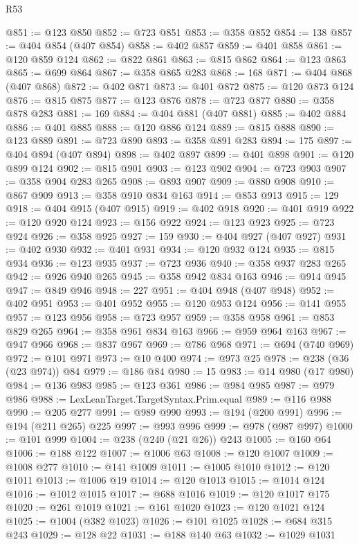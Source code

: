 \begin{lexlean}{R53}
\begin{coremodule}
@851 := @123 @850
@852 := @723 @851
@853 := @358 @852
@854 := 138
@857 := @404 @854 (@407 @854)
@858 := @402 @857
@859 := @401 @858
@861 := @120 @859 @124
@862 := @822 @861
@863 := @815 @862
@864 := @123 @863
@865 := @699 @864
@867 := @358 @865 @283
@868 := 168
@871 := @404 @868 (@407 @868)
@872 := @402 @871
@873 := @401 @872
@875 := @120 @873 @124
@876 := @815 @875
@877 := @123 @876
@878 := @723 @877
@880 := @358 @878 @283
@881 := 169
@884 := @404 @881 (@407 @881)
@885 := @402 @884
@886 := @401 @885
@888 := @120 @886 @124
@889 := @815 @888
@890 := @123 @889
@891 := @723 @890
@893 := @358 @891 @283
@894 := 175
@897 := @404 @894 (@407 @894)
@898 := @402 @897
@899 := @401 @898
@901 := @120 @899 @124
@902 := @815 @901
@903 := @123 @902
@904 := @723 @903
@907 := @358 @904 @283 @265
@908 := @893 @907
@909 := @880 @908
@910 := @867 @909
@913 := @358 @910 @834 @163
@914 := @853 @913
@915 := 129
@918 := @404 @915 (@407 @915)
@919 := @402 @918
@920 := @401 @919
@922 := @120 @920 @124
@923 := @156 @922
@924 := @123 @923
@925 := @723 @924
@926 := @358 @925
@927 := 159
@930 := @404 @927 (@407 @927)
@931 := @402 @930
@932 := @401 @931
@934 := @120 @932 @124
@935 := @815 @934
@936 := @123 @935
@937 := @723 @936
@940 := @358 @937 @283 @265
@942 := @926 @940 @265
@945 := @358 @942 @834 @163
@946 := @914 @945
@947 := @849 @946
@948 := 227
@951 := @404 @948 (@407 @948)
@952 := @402 @951
@953 := @401 @952
@955 := @120 @953 @124
@956 := @141 @955
@957 := @123 @956
@958 := @723 @957
@959 := @358 @958
@961 := @853 @829 @265
@964 := @358 @961 @834 @163
@966 := @959 @964 @163
@967 := @947 @966
@968 := @837 @967
@969 := @786 @968
@971 := @694 (@740 @969)
@972 := @101 @971
@973 := @10 @400
@974 := @973 @25
@978 := @238 (@36 (@23 @974)) @84
@979 := @186 @84
@980 := 15
@983 := @14 @980 (@17 @980)
@984 := @136 @983
@985 := @123 @361
@986 := @984 @985
@987 := @979 @986
@988 := LexLeanTarget.TargetSyntax.Prim.equal
@989 := @116 @988
@990 := @205 @277
@991 := @989 @990
@993 := @194 (@200 @991)
@996 := @194 (@211 @265) @225
@997 := @993 @996
@999 := @978 (@987 @997)
@1000 := @101 @999
@1004 := @238 (@240 (@21 @26)) @243
@1005 := @160 @64
@1006 := @188 @122
@1007 := @1006 @63
@1008 := @120 @1007
@1009 := @1008 @277
@1010 := @141 @1009
@1011 := @1005 @1010
@1012 := @120 @1011
@1013 := @1006 @19
@1014 := @120 @1013
@1015 := @1014 @124
@1016 := @1012 @1015
@1017 := @688 @1016
@1019 := @120 @1017 @175
@1020 := @261 @1019
@1021 := @161 @1020
@1023 := @120 @1021 @124
@1025 := @1004 (@382 @1023)
@1026 := @101 @1025
@1028 := @684 @315 @243
@1029 := @128 @22
@1031 := @188 @140 @63
@1032 := @1029 @1031

\end{coremodule}
\end{lexlean}
